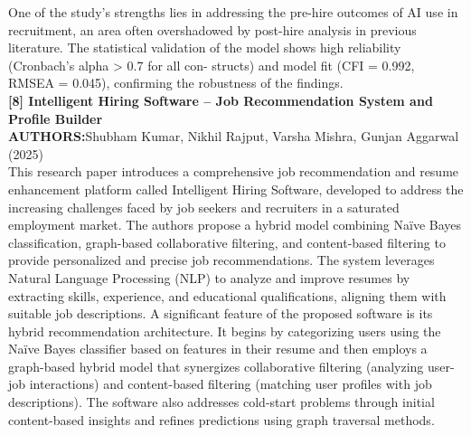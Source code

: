 \documentclass[a4paper, 12pt]{report}
\begin{document}
One of the study’s strengths lies in addressing the pre-hire outcomes of AI use in recruitment, an area often overshadowed by post-hire analysis in previous literature. The statistical validation of the model shows high reliability (Cronbach’s alpha > 0.7 for all con- structs) and model fit (CFI = 0.992, RMSEA = 0.045), confirming the robustness of the findings.
\\
\noindent\textbf{[8] Intelligent Hiring Software – Job Recommendation System and Profile Builder }\\
\textbf{AUTHORS:}Shubham Kumar, Nikhil Rajput, Varsha Mishra, Gunjan Aggarwal (2025)\\
This research paper introduces a comprehensive job recommendation and resume enhancement platform called Intelligent Hiring Software, developed to address the increasing challenges faced by job seekers and recruiters in a saturated employment market. The authors propose a hybrid model combining Naïve Bayes classification, graph-based collaborative filtering, and content-based filtering to provide personalized and precise job recommendations. The system leverages Natural Language Processing (NLP) to analyze and improve resumes by extracting skills, experience, and educational qualifications, aligning them with suitable job descriptions.
A significant feature of the proposed software is its hybrid recommendation architecture. It begins by categorizing users using the Naïve Bayes classifier based on features in their resume and then employs a graph-based hybrid model that synergizes collaborative filtering (analyzing user-job interactions) and content-based filtering (matching user profiles with job descriptions). The software also addresses cold-start problems through initial content-based insights and refines predictions using graph traversal methods.
\end{document}
